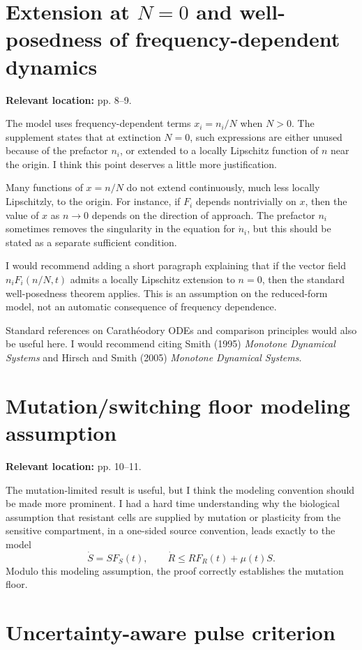 \documentclass[11pt]{article}
\begin{document}
\section{Extension at $N=0$ and well-posedness of frequency-dependent dynamics}

\textbf{Relevant location:} pp. 8–9.

The model uses frequency-dependent terms $x_i=n_i/N$ when $N>0$. The supplement states that at extinction $N=0$, such expressions are either unused because of the prefactor $n_i$, or extended to a locally Lipschitz function of $n$ near the origin. I think this point deserves a little more justification.

Many functions of $x=n/N$ do not extend continuously, much less locally Lipschitzly, to the origin. For instance, if $F_i$ depends nontrivially on $x$, then the value of $x$ as $n\to 0$ depends on the direction of approach. The prefactor $n_i$ sometimes removes the singularity in the equation for $\dot n_i$, but this should be stated as a separate sufficient condition.

I would recommend adding a short paragraph explaining that if the vector field $n_iF_i(n/N,t)$ admits a locally Lipschitz extension to $n=0$, then the standard well-posedness theorem applies. This is an assumption on the reduced-form model, not an automatic consequence of frequency dependence.

Standard references on Carathéodory ODEs and comparison principles would also be useful here. I would recommend citing Smith (1995) \emph{Monotone Dynamical Systems} and Hirsch and Smith (2005) \emph{Monotone Dynamical Systems}.

\section{Mutation/switching floor modeling assumption}

\textbf{Relevant location:} pp. 10–11.

The mutation-limited result is useful, but I think the modeling convention should be made more prominent. I had a hard time understanding why the biological assumption that resistant cells are supplied by mutation or plasticity from the sensitive compartment, in a one-sided source convention, leads exactly to the model
\[
\dot S= SF_S(t), \qquad \dot R\leq RF_R(t) + \mu(t)S.
\]
Modulo this modeling assumption, the proof correctly establishes the mutation floor.

\section{Uncertainty-aware pulse criterion}
\end{document}
